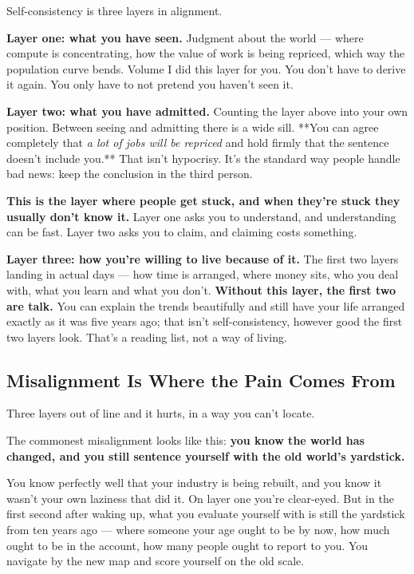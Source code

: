 \documentclass[11pt,a4paper]{article}
\begin{document}
Self-consistency is three layers in alignment.

\textbf{Layer one: what you have seen.} Judgment about the world --- where compute is concentrating, how the value of work is being repriced, which way the population curve bends. Volume I did this layer for you. You don't have to derive it again. You only have to not pretend you haven't seen it.

\textbf{Layer two: what you have admitted.} Counting the layer above into your own position. Between seeing and admitting there is a wide sill. **You can agree completely that \textit{a lot of jobs will be repriced} and hold firmly that the sentence doesn't include you.** That isn't hypocrisy. It's the standard way people handle bad news: keep the conclusion in the third person.

\textbf{This is the layer where people get stuck, and when they're stuck they usually don't know it.} Layer one asks you to understand, and understanding can be fast. Layer two asks you to claim, and claiming costs something.

\textbf{Layer three: how you're willing to live because of it.} The first two layers landing in actual days --- how time is arranged, where money sits, who you deal with, what you learn and what you don't. \textbf{Without this layer, the first two are talk.} You can explain the trends beautifully and still have your life arranged exactly as it was five years ago; that isn't self-consistency, however good the first two layers look. That's a reading list, not a way of living.

\subsection{Misalignment Is Where the Pain Comes From}

Three layers out of line and it hurts, in a way you can't locate.

The commonest misalignment looks like this: \textbf{you know the world has changed, and you still sentence yourself with the old world's yardstick.}

You know perfectly well that your industry is being rebuilt, and you know it wasn't your own laziness that did it. On layer one you're clear-eyed. But in the first second after waking up, what you evaluate yourself with is still the yardstick from ten years ago --- where someone your age ought to be by now, how much ought to be in the account, how many people ought to report to you. You navigate by the new map and score yourself on the old scale.
\end{document}
